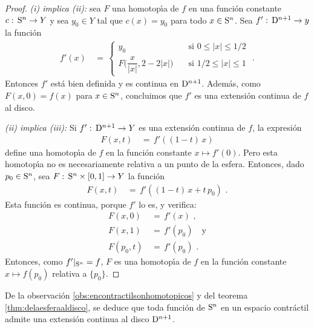 \begin{proof}
	\emph{(i) implica (ii):} sea $F$ una homotop\'{\i}a de $f$ en una
	funci\'{o}n constante $c:\,\mathrm{S}^{n}\rightarrow Y$ y sea $y_{0}\in Y$
	tal que $c(x)=y_{0}$ para todo $x\in\mathrm{S}^{n}$. Sea
	$f':\,\mathrm{D}^{n+1}\rightarrow y$ la funci\'{o}n
	\begin{align*}
		f'(x) & \,=\,
			\begin{cases}
				y_{0} & \quad\text{si }
					0\leq |x|\leq 1/2 \\[10pt]
				F\Big(\dfrac{x}{|x|},2-2|x|\Big)
					& \quad\text{si }1/2\leq |x|\leq 1
			\end{cases}
		\text{ .}
	\end{align*}
	Entonces $f'$ est\'{a} bien definida y es continua en $\mathrm{D}^{n+1}$.
	Adem\'{a}s, como $F(x,0)=f(x)$ para $x\in\mathrm{S}^{n}$, concluimos que
	$f'$ es una extensi\'{o}n continua de $f$ al disco.

	\emph{(ii) implica (iii):} Si $f':\,\mathrm{D}^{n+1}\rightarrow Y$ es una
	extensi\'{o}n continua de $f$, la expresi\'{o}n
	\begin{align*}
		F(x,t) & \,=\,f'((1-t)\,x)
	\end{align*}
	define una homotop\'{\i}a de $f$ en la funci\'{o}n constante
	$x\mapsto f'(0)$. Pero esta homotop\'{\i}a no es necesariamente
	relativa a un punto de la esfera. Entonces, dado $p_{0}\in\mathrm{S}^{n}$,
	sea $F:\,\mathrm{S}^{n}\times\left[0,1\right]\rightarrow Y$ la funci\'{o}n
	\begin{align*}
		F(x,t) & \,=\,f'((1-t)\,x+t\,p_{0})
		\text{ .}
	\end{align*}
	Esta funci\'{o}n es continua, porque $f'$ lo es, y verifica:
	\begin{align*}
		F(x,0) & \,=\,f'(x) \text{ ,} \\
		F(x,1) & \,=\,f'(p_{0}) \quad\text{y} \\
		F(p_{0},t) & \,=\,f'(p_{0})
		\text{ .}
	\end{align*}
	Entonces, como $f'|_{\mathrm{S}^{n}}=f$, $F$ es una homotop\'{\i}a de
	$f$ en la funci\'{o}n constante $x\mapsto f(p_{0})$ relativa a
	$\{p_{0}\}$.
\end{proof}

\begin{obsDeLaEsferaAlDisco}\label{obs:delaesferaaldisco}
	De la observaci\'{o}n \ref{obs:encontractilsonhomotopicos} y del
	teorema \ref{thm:delaesferaaldisco}, se deduce que toda funci\'{o}n de
	$\mathrm{S}^{n}$ en un espacio contr\'{a}ctil admite una extensi\'{o}n
	continua al disco $\mathrm{D}^{n+1}$.
\end{obsDeLaEsferaAlDisco}
